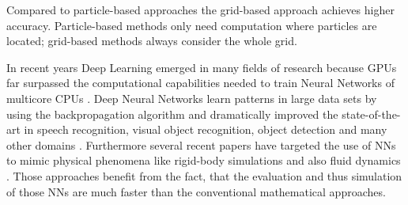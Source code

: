 \newpage
\par Compared to particle-based approaches the grid-based approach achieves higher accuracy. Particle-based methods only need computation where particles are located; grid-based methods always consider the whole grid.
\par In recent years Deep Learning emerged in many fields of research because GPUs far surpassed the computational capabilities needed to train Neural Networks of multicore CPUs \parencite{raina2009large}. Deep Neural Networks learn patterns in large data sets by using the backpropagation algorithm and dramatically improved the state-of-the-art in speech recognition, visual object recognition, object detection and many other domains \parencite{lecun2015deep}. Furthermore several recent papers have targeted the use of NNs to mimic physical phenomena like rigid-body simulations \parencite{chang2016compositional} and also fluid dynamics \parencite{tompson2017accelerating}  \parencite{chu2017data} \parencite{schenck2018spnets}. Those approaches benefit from the fact, that the evaluation and thus simulation of those NNs are much faster than the conventional mathematical approaches.